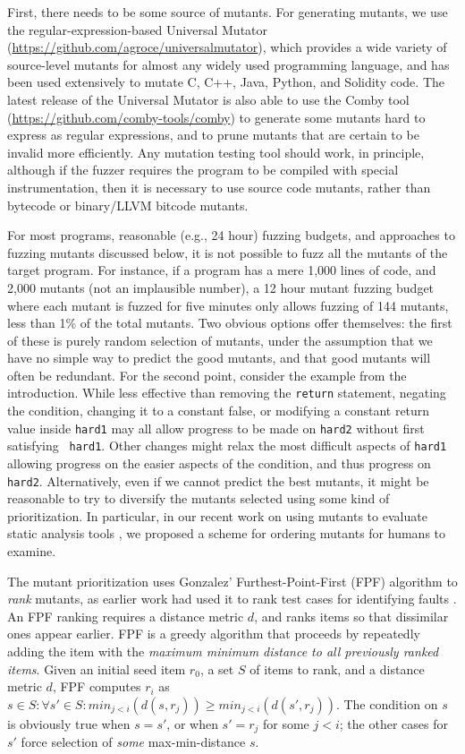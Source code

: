 First, there needs to be some source of mutants.  For generating
mutants, we use the regular-expression-based Universal Mutator
\cite{regexpMut} (\url{https://github.com/agroce/universalmutator}),
which provides a wide variety of source-level mutants for almost any
widely used programming language, and has been used extensively to
mutate C, C++, Java, Python, and Solidity code.  The latest release of
the Universal Mutator is also able to use the Comby \cite{combypaper}
tool (\url{https://github.com/comby-tools/comby}) to generate some
mutants hard to express as regular expressions, and to prune mutants
that are certain to be invalid more efficiently.  Any mutation testing
tool should work, in principle, although if the fuzzer requires the
program to be compiled with special instrumentation, then it is
necessary to use source code mutants, rather than bytecode or
binary/LLVM bitcode mutants.

For most programs, reasonable (e.g., 24 hour) fuzzing budgets, and
approaches to fuzzing mutants discussed below, it is not possible to
fuzz all the mutants of the target program.  For instance, if a
program has a mere 1,000 lines of code, and 2,000 mutants (not an
implausible number), a 12 hour mutant fuzzing budget where each mutant
is fuzzed for five minutes only allows fuzzing of 144 mutants, less
than 1\% of the total mutants.  Two obvious options offer themselves:
the first of these is
purely random selection of mutants, under the assumption that we have
no simple way to predict the good mutants, and that good mutants will
often be redundant.  For the second point, consider the example from
the introduction.  While less effective than removing the {\tt return}
statement, negating the condition, changing it to a constant false, or
modifying a constant return value inside {\tt hard1} may all allow
progress to be made on {\tt hard2} without first satisfying {\tt
  hard1}.  Other changes might relax the most difficult aspects of
{\tt hard1} allowing progress on the easier aspects of the condition,
and thus progress on {\tt hard2}.  Alternatively, even if we cannot
predict the best mutants, it might be reasonable to try to diversify
the mutants selected using some kind of prioritization.  In
particular, in our recent work on using mutants to evaluate static
analysis tools \cite{QRS2021}, we proposed a scheme for ordering
mutants for humans to examine.  

The mutant prioritization
uses Gonzalez' Furthest-Point-First \cite{Gonzalez} (FPF) algorithm
to \emph{rank} mutants, as earlier work had used it to rank test cases for identifying faults \cite{PLDI13}.
An
FPF ranking requires a distance metric $d$, and ranks items so that
dissimilar ones appear earlier.  FPF is a
greedy algorithm that proceeds by repeatedly adding the item with the
\emph{maximum minimum distance to all previously ranked items}. Given an
initial seed item $r_0$, a set $S$ of items to rank, and a distance
metric $d$, FPF computes $r_i$ as
$s \in S: \forall s' \in S: min_{ j < i}(d(s,r_j)) \geq min_{j <
  i}(d(s',r_j))$.  The condition on $s$ is obviously true when
$s = s'$, or when $s' = r_j$ for some $j < i$; the other cases for
$s'$ force selection of \emph{some}
max-min-distance $s$.


